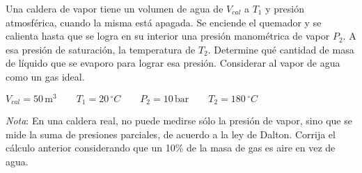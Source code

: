 \item Una caldera de vapor tiene un volumen de agua de $V_{cal}$ a $T_{1}$ y presión atmosférica, cuando la misma está apagada. Se enciende el quemador  y se calienta hasta que se logra en su interior una presión manométrica de vapor $P_2$. A esa presión de saturación, la temperatura de $T_{2}$. Determine qué cantidad de masa de líquido que se evaporo para lograr esa presión. Considerar al vapor de agua como un gas ideal.

\begin{center}
$V_{cal} = 50\,\text{m}^3 \qquad T_1 = 20 \,^\circ C  \qquad P_2 = 10\,\text{bar} \qquad T_2 = 180\,^\circ C  $
\end{center}

\textit{Nota}: En una caldera real, no puede medirse sólo la presión de vapor, sino que se mide la suma de presiones parciales, de acuerdo a la ley de Dalton. Corrija el cálculo anterior considerando que un 10\% de la masa de gas es aire en vez de agua.
